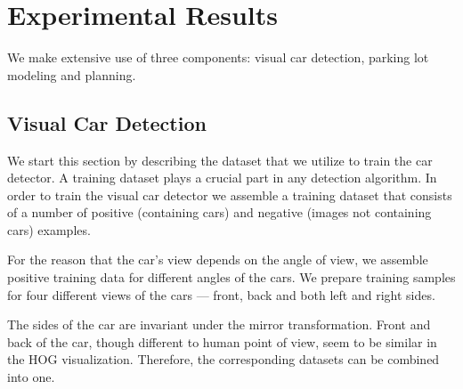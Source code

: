 
\chapter{Experimental Results}
\label{cha:experimental_results}

We make extensive use of three components: visual car detection,
parking lot modeling and planning.

\section{Visual Car Detection}
\label{sec:visual_car_detection}

We start this section by describing the dataset that we utilize to train the
car detector. A training dataset plays a crucial part in any detection
algorithm. In order to train the visual car detector we assemble a training
dataset that consists of a number of positive (containing cars) and negative
(images not containing cars) examples.

For the reason that the car's view depends on the angle of view, we assemble
positive training data for different angles of the cars. We prepare training
samples for four different views of the cars --- front, back and both left and
right sides.

The sides of the car are invariant under the mirror transformation. Front and
back of the car, though different to human point of view, seem to be similar
in the HOG visualization. Therefore, the corresponding datasets can be
combined into one.


